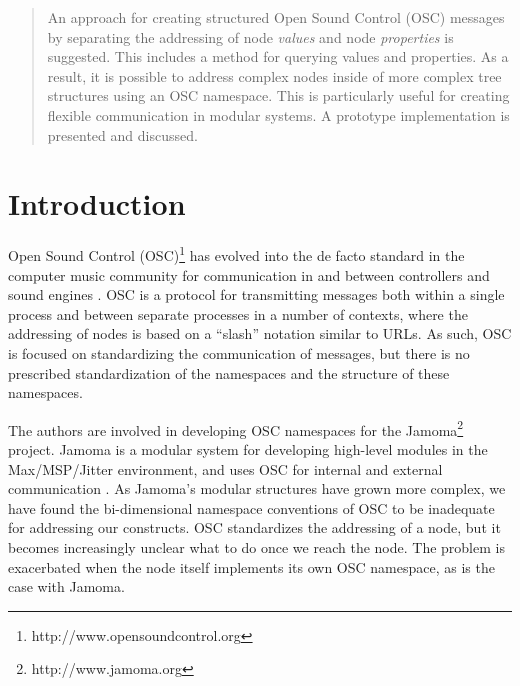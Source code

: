 \documentclass{NIME-alternate}
\begin{document}
\maketitle



\begin{abstract}

An approach for creating structured Open Sound Control (OSC) messages by separating the addressing of node \emph{values} and node \emph{properties} is suggested. This includes a method for querying values and properties. As a result, it is possible to address complex nodes inside of more complex tree structures using an OSC namespace. This is particularly useful for creating flexible communication in modular systems.  A prototype implementation is presented and discussed.

\end{abstract}




\section{Introduction} %
\label{sec:introduction}

Open Sound Control (OSC)\footnote{http://www.opensoundcontrol.org} has evolved into the de facto standard in the computer music community for communication in and between controllers and sound engines \cite{Wright:2003}. OSC is a protocol for transmitting messages both within a single process and between separate processes in a number of contexts, where the addressing of nodes is based on a ``slash'' notation similar to URLs. As such, OSC is focused on standardizing the communication of messages, but there is no prescribed standardization of the namespaces and the structure of these namespaces. 

The authors are involved in developing OSC namespaces for the Jamoma\footnote{http://www.jamoma.org} project. Jamoma is a modular system for developing high-level modules in the Max/MSP/Jitter environment, and uses OSC for internal and external communication \cite{Place:2006}.  As Jamoma's modular structures have grown more complex, we have found the bi-dimensional namespace conventions of OSC to be inadequate for addressing our constructs.  OSC standardizes the addressing of a node, but it becomes increasingly unclear what to do once we reach the node.  The problem is exacerbated when the node itself implements its own OSC namespace, as is the case with Jamoma.
\end{document}
